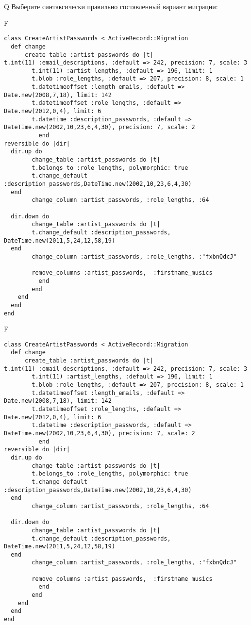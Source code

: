 Q
Выберите синтаксически правильно составленный вариант миграции:

F
\begin{verbatim}
class CreateArtistPasswords < ActiveRecord::Migration
  def change
	  create_table :artist_passwords do |t|
t.int(11) :email_descriptions, :default => 242, precision: 7, scale: 3
		t.int(11) :artist_lengths, :default => 196, limit: 1
		t.blob :role_lengths, :default => 207, precision: 8, scale: 1
		t.datetimeoffset :length_emails, :default => Date.new(2008,7,18), limit: 142
		t.datetimeoffset :role_lengths, :default => Date.new(2012,0,4), limit: 6
		t.datetime :description_passwords, :default => DateTime.new(2002,10,23,6,4,30), precision: 7, scale: 2
		  end
reversible do |dir|
  dir.up do
		change_table :artist_passwords do |t|
		t.belongs_to :role_lengths, polymorphic: true
 		t.change_default :description_passwords,DateTime.new(2002,10,23,6,4,30)
  end
 		change_column :artist_passwords, :role_lengths, :64
   
  dir.down do
		change_table :artist_passwords do |t|
		t.change_default :description_passwords, DateTime.new(2011,5,24,12,58,19)
  end
 		change_column :artist_passwords, :role_lengths, :"fxbnQdcJ"
   
		remove_columns :artist_passwords,  :firstname_musics 
	      end
	    end
    end 
  end
end

\end{verbatim}

F
\begin{verbatim}
class CreateArtistPasswords < ActiveRecord::Migration
  def change
	  create_table :artist_passwords do |t|
t.int(11) :email_descriptions, :default => 242, precision: 7, scale: 3
		t.int(11) :artist_lengths, :default => 196, limit: 1
		t.blob :role_lengths, :default => 207, precision: 8, scale: 1
		t.datetimeoffset :length_emails, :default => Date.new(2008,7,18), limit: 142
		t.datetimeoffset :role_lengths, :default => Date.new(2012,0,4), limit: 6
		t.datetime :description_passwords, :default => DateTime.new(2002,10,23,6,4,30), precision: 7, scale: 2
		  end
reversible do |dir|
  dir.up do
		change_table :artist_passwords do |t|
		t.belongs_to :role_lengths, polymorphic: true
 		t.change_default :description_passwords,DateTime.new(2002,10,23,6,4,30)
  end
 		change_column :artist_passwords, :role_lengths, :64
   
  dir.down do
		change_table :artist_passwords do |t|
		t.change_default :description_passwords, DateTime.new(2011,5,24,12,58,19)
  end
 		change_column :artist_passwords, :role_lengths, :"fxbnQdcJ"
   
		remove_columns :artist_passwords,  :firstname_musics 
	      end
	    end
    end 
  end
end

\end{verbatim}

